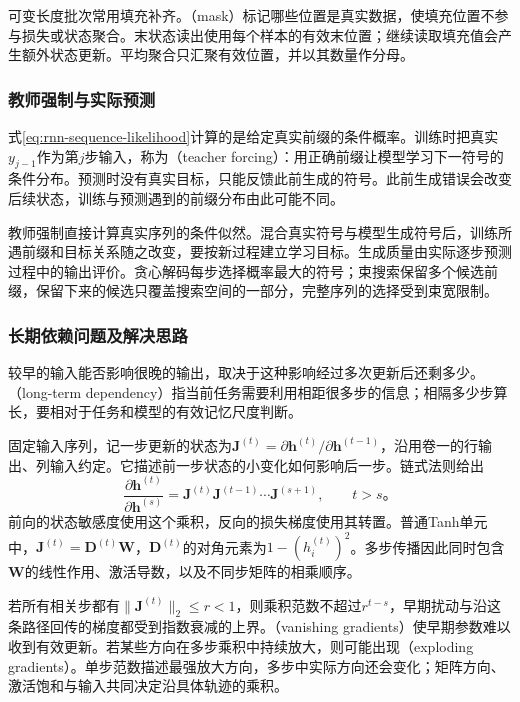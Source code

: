 可变长度批次常用填充补齐。（mask）标记哪些位置是真实数据，使填充位置不参与损失或状态聚合。末状态读出使用每个样本的有效末位置；继续读取填充值会产生额外状态更新。平均聚合只汇聚有效位置，并以其数量作分母。

\subsubsection{教师强制与实际预测}
\label{sec:rnn-teacher-forcing}

式\eqref{eq:rnn-sequence-likelihood}计算的是给定真实前缀的条件概率。训练时把真实$y_{j-1}$作为第$j$步输入，称为（teacher forcing）：用正确前缀让模型学习下一符号的条件分布。预测时没有真实目标，只能反馈此前生成的符号。此前生成错误会改变后续状态，训练与预测遇到的前缀分布由此可能不同。

教师强制直接计算真实序列的条件似然。混合真实符号与模型生成符号后，训练所遇前缀和目标关系随之改变，要按新过程建立学习目标。生成质量由实际逐步预测过程中的输出评价。贪心解码每步选择概率最大的符号；束搜索保留多个候选前缀，保留下来的候选只覆盖搜索空间的一部分，完整序列的选择受到束宽限制。

\subsubsection{长期依赖问题及解决思路}
\label{sec:rnn-long-dependencies}

较早的输入能否影响很晚的输出，取决于这种影响经过多次更新后还剩多少。（long-term dependency）指当前任务需要利用相距很多步的信息；相隔多少步算长，要相对于任务和模型的有效记忆尺度判断。

固定输入序列，记一步更新的状态为$\bm{J}^{(t)}=\partial\bm{h}^{(t)}/\partial\bm{h}^{(t-1)}$，沿用卷一的行输出、列输入约定。它描述前一步状态的小变化如何影响后一步。链式法则给出
\begin{equation}
  \frac{\partial\bm{h}^{(t)}}{\partial\bm{h}^{(s)}}
    =\bm{J}^{(t)}\bm{J}^{(t-1)}\cdots\bm{J}^{(s+1)},
    \qquad t>s\text{。}
  \label{eq:rnn-jacobian-product}
\end{equation}
前向的状态敏感度使用这个乘积，反向的损失梯度使用其转置。普通Tanh单元中，$\bm{J}^{(t)}=\bm{D}^{(t)}\bm{W}$，$\bm{D}^{(t)}$的对角元素为$1-(h_i^{(t)})^2$。多步传播因此同时包含$\bm{W}$的线性作用、激活导数，以及不同步矩阵的相乘顺序。

若所有相关步都有$\lVert\bm{J}^{(t)}\rVert_2\leq r<1$，则乘积范数不超过$r^{t-s}$，早期扰动与沿这条路径回传的梯度都受到指数衰减的上界。（vanishing gradients）使早期参数难以收到有效更新。若某些方向在多步乘积中持续放大，则可能出现（exploding gradients）。单步范数描述最强放大方向，多步中实际方向还会变化；矩阵方向、激活饱和与输入共同决定沿具体轨迹的乘积。

